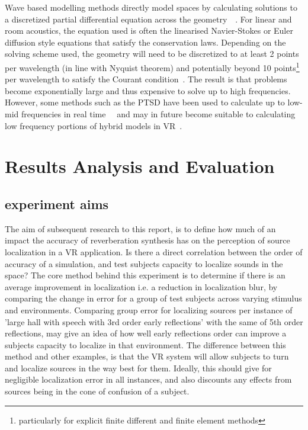 \documentclass[paper=a4, fontsize=10pt, font=arial]{scrartcl} %
\numberwithin{equation}{section} %
\numberwithin{figure}{section} %
\numberwithin{table}{section} %
\begin{document}
Wave based modelling methods directly model spaces by calculating solutions to a discretized partial differential equation across the geometry~\cite{Botteldooren1995}~\cite{Bilbao2013}. For linear and room acoustics, the equation used is often the linearised Navier-Stokes or Euler diffusion style equations that satisfy the conservation laws. Depending on the solving scheme used, the geometry will need to be discretized to at least 2 points per wavelength (in line with Nyquist theorem) and potentially beyond 10 points\footnote{particularly for explicit finite different and finite element methods} per wavelength to satisfy the Courant condition~\cite{Siltanen2013}. The result is that problems become exponentially large and thus expensive to solve up to high frequencies. However, some methods such as the PTSD have been used to calculate up to low-mid frequencies in real time~\cite{Angus2010}~\cite{Savioja2010} and may in future become suitable to calculating low frequency portions of hybrid models in VR~\cite{Southern2012}.

\newpage
\section{Results Analysis and Evaluation}
\subsection{experiment aims}
The aim of subsequent research to this report, is to define how much of an impact the accuracy of reverberation synthesis has on the perception of source localization in a VR application. Is there a direct correlation between the order of accuracy of a simulation, and test subjects capacity to localize sounds in the space? 
The core method behind this experiment is to determine if there is an average improvement in localization i.e. a reduction in localization blur, by comparing the change in error for a group of test subjects across varying stimulus and environments. Comparing group error for localizing sources per instance of 'large hall with speech with 3rd order early reflections' with the same of 5th order reflections, may give an idea of how well early reflections order can improve a subjects capacity to localize in that environment. The difference between this method and other examples, is that the VR system will allow subjects to turn and localize sources in the way best for them. Ideally, this should give for negligible localization error in all instances, and also discounts any effects from sources being in the cone of confusion of a subject.
\end{document}
